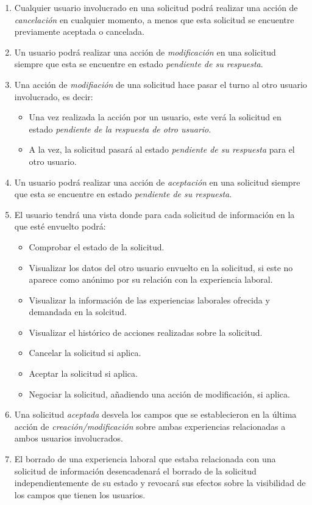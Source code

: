 \documentclass[a4paper, 12pt]{book}
\begin{document}
\begin{enumerate}
        \item Cualquier usuario involucrado en una solicitud podrá realizar una acción de \emph{cancelación} en cualquier momento, a menos que esta solicitud se encuentre previamente aceptada o cancelada.
        \item Un usuario podrá realizar una acción de \emph{modificación} en una solicitud siempre que esta se encuentre en estado \emph{pendiente de su respuesta}.
        \item Una acción de \emph{modifiación} de una solicitud hace pasar el turno al otro usuario involucrado, es decir:
        \begin{itemize}
            \item Una vez realizada la acción por un usuario, este verá la solicitud en estado \emph{pendiente de la respuesta de otro usuario}.
            \item A la vez, la solicitud pasará al estado \emph{pendiente de su respuesta} para el otro usuario.
        \end{itemize}
        \item Un usuario podrá realizar una acción de \emph{aceptación} en una solicitud siempre que esta se encuentre en estado \emph{pendiente de su respuesta}.
        \item El usuario tendrá una vista donde para cada solicitud de información en la que esté envuelto podrá:
        \begin{itemize}
            \item Comprobar el estado de la solicitud.
            \item Visualizar los datos del otro usuario envuelto en la solicitud, si este no aparece como anónimo por su relación con la experiencia laboral.
            \item Visualizar la información de las experiencias laborales ofrecida y demandada en la solcitud.
            \item Visualizar el histórico de acciones realizadas sobre la solicitud.
            \item Cancelar la solicitud si aplica.
            \item Aceptar la solicitud si aplica.
            \item Negociar la solicitud, añadiendo una acción de modificación, si aplica.
        \end{itemize}
        \item Una solicitud \emph{aceptada} desvela los campos que se establecieron en la última acción de \emph{creación/modificación} sobre ambas experiencias relacionadas a ambos usuarios involucrados.
        \item El borrado de una experiencia laboral que estaba relacionada con una solicitud de información desencadenará el borrado de la solicitud independientemente de su estado y revocará sus efectos sobre la visibilidad de los campos que tienen los usuarios.

    \end{enumerate}
\end{document}
